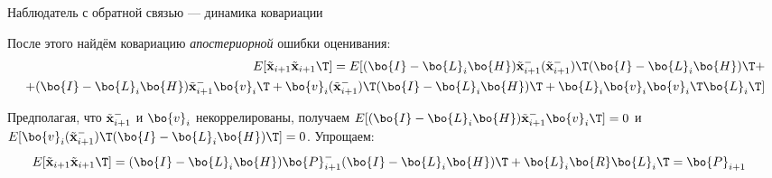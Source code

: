 \documentclass{beamer}
\newcommand{\btil}[1] {\Tilde{\mathbf{#1}}}
\begin{document}
\begin{frame}{Наблюдатель с обратной связью — динамика ковариации}
	\begin{flushleft}
		
		
		После этого найдём ковариацию \emph{апостериорной} ошибки оценивания:
		\begin{align*}
			E[\btil{x}_{i+1} \btil{x}_{i+1}\T] 
			=
			E[ (\bo{I} - \bo{L}_i \bo{H}) \btil{x}_{i+1}^- (\btil{x}_{i+1}^-)\T (\bo{I} - \bo{L}_i \bo{H})\T + \\
			+(\bo{I} - \bo{L}_i \bo{H}) \btil{x}_{i+1}^- \bo{v}_i\T +
			\bo{v}_i (\btil{x}_{i+1}^-)\T (\bo{I} - \bo{L}_i \bo{H})\T +
			\bo{L}_i \bo{v}_i \bo{v}_i\T \bo{L}_i\T]
		\end{align*}
		
		Предполагая, что $\btil{x}_{i+1}^-$ и $\bo{v}_i$ некоррелированы, получаем $E[(\bo{I} - \bo{L}_i \bo{H}) \btil{x}_{i+1}^- \bo{v}_i\T] = 0$ и $E[\bo{v}_i (\btil{x}_{i+1}^-)\T (\bo{I} - \bo{L}_i \bo{H})\T] = 0$. Упрощаем:
		\begin{align*}
			E[\btil{x}_{i+1} \btil{x}_{i+1}\T] 
			&=
			(\bo{I} - \bo{L}_i \bo{H}) \bo{P}_{i+1}^- (\bo{I} - \bo{L}_i \bo{H})\T +\bo{L}_i\bo{R}\bo{L}_i\T = \bo{P}_{i+1}
		\end{align*}
		
	\end{flushleft}
\end{frame}






\begin{frame}
	\begin{flushleft}
		
		
	\end{flushleft}
\end{frame}
\end{document}
